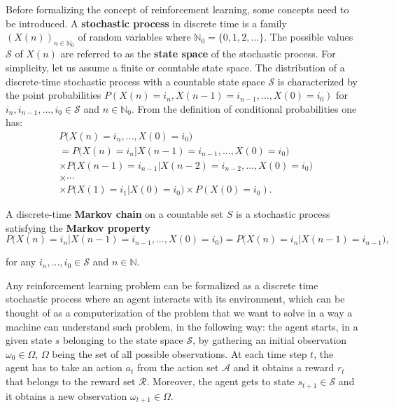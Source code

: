 \documentclass[11pt]{article}
\theoremstyle{definition}
\begin{document}
Before formalizing the concept of reinforcement learning, some concepts need to be introduced. A \textbf{stochastic process} in discrete time is a family $(X(n))_{n \in \mathbb{N}_0}$ of random variables where $\mathbb{N}_0 = \{0, 1, 2, ...\}$. The possible values $\mathcal{S}$ of $X(n)$ are referred to as the \textbf{state space} of the stochastic process. For simplicity, let us assume a finite or countable state space. The distribution of a discrete-time stochastic process with a countable state space $\mathcal{S}$ is characterized by the point probabilities $P(X(n)=i_n, X(n-1)=i_{n-1},...,X(0)=i_0)$ for $i_n, i_{n-1},..., i_0 \in \mathcal{S}$ and $n \in \mathbb{N}_0$. From the definition of conditional probabilities one has:
\begin{align*}
    &P\big(X(n) = i_n, ..., X(0)=i_0\big) \\ &= P\big(X(n)=i_n | X(n-1)=i_{n-1},...,X(0)=i_0\big) \\ &\times P\big(X(n-1)=i_{n-1} | X(n-2)=i_{n-2},...,X(0)=i_0\big) \\ &\times \cdots \\ &\times P\big(X(1)=i_1 | X(0)=i_0\big) \times P(X(0)=i_0).
\end{align*}

A discrete-time \textbf{Markov chain} on a countable set $S$ is a stochastic process satisfying the \textbf{Markov property} 
\begin{equation} \label{markov_prop}
    P\big(X(n) = i_n | X(n-1) = i_{n-1}, ..., X(0) = i_0\big) = P\big(X(n)=i_n | X(n-1) = i_{n-1}\big),
\end{equation}

for any $i_n, ..., i_0  \in \mathcal{S}$ and $n \in \mathbb{N}$.

Any reinforcement learning problem can be formalized as a discrete time stochastic process where an agent interacts with its environment, which can be thought of as a computerization of the problem that we want to solve in a way a machine can understand such problem, in the following way: the agent starts, in a given state $s$ belonging to the state space $\mathcal{S}$, by gathering an initial observation $\omega_0 \in \Omega$, $\Omega$ being the set of all possible observations. At each time step $t$, the agent has to take an action $a_t$ from the action set $\mathcal{A}$ and it obtains a reward $r_t$ that belongs to the reward set $\mathcal{R}$. Moreover, the agent gets to state $s_{t+1} \in \mathcal{S}$ and it obtains a new observation $\omega_{t+1} \in \Omega$.
\end{document}
